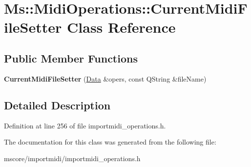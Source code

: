 \hypertarget{class_ms_1_1_midi_operations_1_1_current_midi_file_setter}{}\section{Ms\+:\+:Midi\+Operations\+:\+:Current\+Midi\+File\+Setter Class Reference}
\label{class_ms_1_1_midi_operations_1_1_current_midi_file_setter}
\subsection*{Public Member Functions}
\begin{DoxyCompactItemize}
\item 
\mbox{\label{class_ms_1_1_midi_operations_1_1_current_midi_file_setter_a34463dba2c1e49b994da1c0c5ea63aa1}} 
{\bfseries Current\+Midi\+File\+Setter} (\hyperlink{class_ms_1_1_midi_operations_1_1_data}{Data} \&opers, const Q\+String \&file\+Name)
\end{DoxyCompactItemize}


\subsection{Detailed Description}


Definition at line 256 of file importmidi\+\_\+operations.\+h.



The documentation for this class was generated from the following file\+:\begin{DoxyCompactItemize}
\item 
mscore/importmidi/importmidi\+\_\+operations.\+h\end{DoxyCompactItemize}
